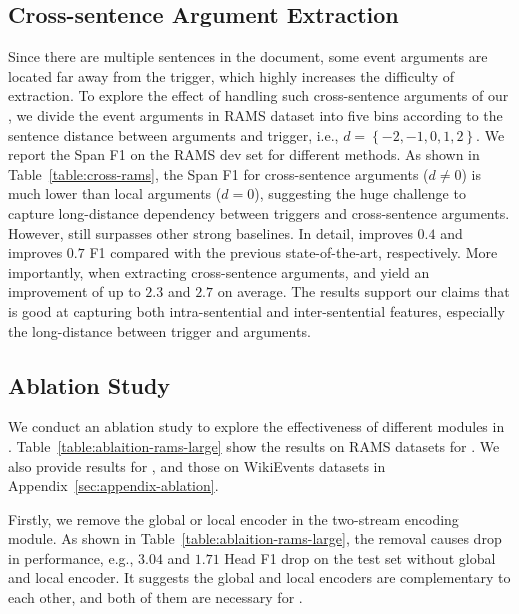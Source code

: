 \subsection{Cross-sentence Argument Extraction}

Since there are multiple sentences in the document, some event arguments are located far away from the trigger, which highly increases the difficulty of extraction.
To explore the effect of handling such cross-sentence arguments of our \modelname, we divide the event arguments in RAMS dataset into five bins according to the sentence distance between arguments and trigger, i.e., $d=\left \{ -2, -1, 0, 1, 2 \right \} $.
We report the Span F1 on the RAMS dev set for different methods.
As shown in Table~\ref{table:cross-rams}, the Span F1 for cross-sentence arguments ($d\neq0$) is much lower than local arguments ($d=0$), suggesting the huge challenge to capture long-distance dependency between triggers and cross-sentence arguments.
However, \modelname still surpasses other strong baselines.
In detail, \modelnamebase improves $0.4$ and \modelnamelarge improves $0.7$ F1 compared with the previous state-of-the-art, respectively.
More importantly, when extracting cross-sentence arguments, \modelnamebase and \modelnamelarge yield an improvement of up to $2.3$ and $2.7$ on average.
The results support our claims that \modelname is good at capturing both intra-sentential and inter-sentential features, especially the long-distance between trigger and arguments.






\subsection{Ablation Study}

We conduct an ablation study to explore the effectiveness of different modules in \modelname.
Table~\ref{table:ablaition-rams-large} show the results on RAMS datasets for \modelnamelarge.
We also provide results for \modelnamebase, and those on WikiEvents datasets in Appendix~\ref{sec:appendix-ablation}.

Firstly, we remove the global or local encoder in the two-stream encoding module.
As shown in Table~\ref{table:ablaition-rams-large}, the removal causes drop in performance, e.g., $3.04$ and $1.71$ Head F1 drop on the test set without global and local encoder.
It suggests the global and local encoders are complementary to each other, and both of them are necessary for \modelname.

